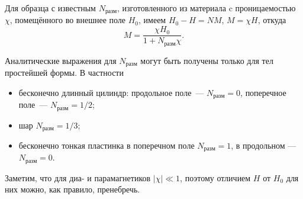 Для образца с известным $N_{разм}$, изготовленного из материала
c проницаемостью $\chi$, помещённого во внешнее поле $H_0$, имеем
$H_0 - H = N M$, $M=\chi H$, откуда
\begin{equation*}
M = \frac{\chi H_0}{1+N_{разм}\chi}.
\end{equation*}

Аналитические выражения для $N_{разм}$ могут быть получены только для тел
простейшей формы. В частности
\begin{itemize}
    \item бесконечно длинный цилиндр: продольное поле~--- $N_{разм} = 0$,
          поперечное поле~--- $N_{разм} = 1/2$;
    \item шар $N_{разм} = 1/3$;
    \item бесконечно тонкая пластинка в поперечном поле $N_{разм} = 1$,
          в продольном --- $N_{разм} = 0$.
\end{itemize}

Заметим, что для диа- и парамагнетиков $|\chi|\ll 1$, поэтому отличием $H$ от
$H_0$ для них можно, как правило, пренебречь.

